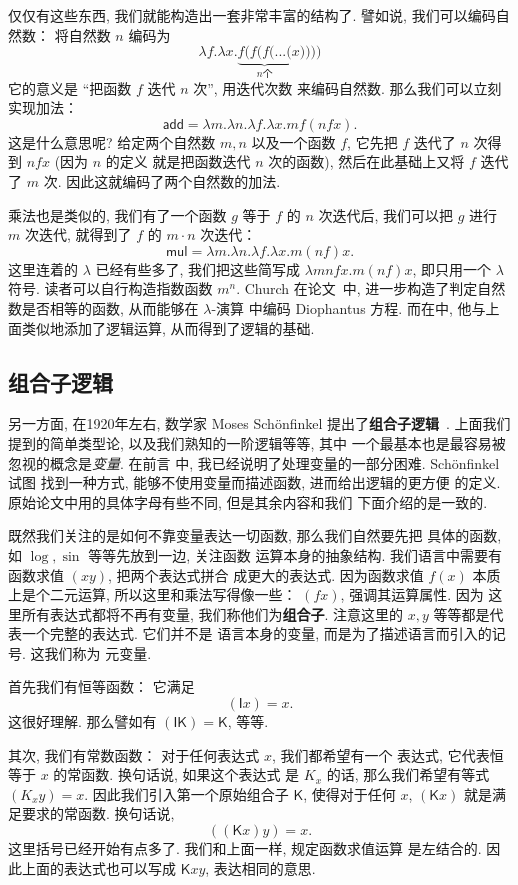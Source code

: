 \documentclass[UTF8]{ctexbook}
\newcommand{\cons}[1]{\textsf{#1}}
\theoremstyle{plain}
\theoremstyle{definition}
\theoremstyle{remark}
\begin{document}
仅仅有这些东西, 我们就能构造出一套非常丰富的结构了. 譬如说,
我们可以编码自然数： 将自然数 \(n\) 编码为
\[\lambda f. \lambda x. \underbrace{f(f(f(...(}_{n\text{个}}x))))\]
它的意义是 “把函数 \(f\) 迭代 \(n\) 次”, 用迭代次数
来编码自然数. 那么我们可以立刻实现加法：
\[\cons{add} = \lambda m. \lambda n. \lambda f. \lambda x. mf(nfx).\]
这是什么意思呢? 给定两个自然数 \(m, n\) 以及一个函数 \(f\),
它先把 \(f\) 迭代了 \(n\) 次得到 \(nfx\) (因为 \(n\) 的定义
就是把函数迭代 \(n\) 次的函数), 然后在此基础上又将
\(f\) 迭代了 \(m\) 次. 因此这就编码了两个自然数的加法.

乘法也是类似的, 我们有了一个函数 \(g\) 等于 \(f\) 的 \(n\)
次迭代后, 我们可以把 \(g\) 进行 \(m\) 次迭代, 就得到了
\(f\) 的 \(m\cdot n\) 次迭代：
\[\cons{mul} = \lambda m. \lambda n. \lambda f. \lambda x. m(nf)x.\]
这里连着的 \(\lambda\) 已经有些多了, 我们把这些简写成
\(\lambda mnfx. m(nf)x\), 即只用一个 \(\lambda\) 符号.
读者可以自行构造指数函数 \(m^n\). Church 在论文~\cite{church:1936:lambda}中,
进一步构造了判定自然数是否相等的函数, 从而能够在 \(\lambda\)-演算
中编码 Diophantus 方程. 而在\cite{church:1932:untyped}中,
他与上面类似地添加了逻辑运算, 从而得到了逻辑的基础.

\subsection{组合子逻辑}
另一方面, 在1920年左右, 数学家 Moses Sch\"onfinkel 提出了\textbf{组合子逻辑}~\cite{schonfinkel:1924:combinator}.
上面我们提到的简单类型论, 以及我们熟知的一阶逻辑等等, 其中
一个最基本也是最容易被忽视的概念是\emph{变量}. 在前言
中, 我已经说明了处理变量的一部分困难. Sch\"onfinkel 试图
找到一种方式, 能够不使用变量而描述函数, 进而给出逻辑的更方便
的定义. 原始论文中用的具体字母有些不同, 但是其余内容和我们
下面介绍的是一致的.

既然我们关注的是如何不靠变量表达一切函数, 那么我们自然要先把
具体的函数, 如 \(\log, \sin\) 等等先放到一边, 关注函数
运算本身的抽象结构. 我们语言中需要有函数求值 \((xy)\), 把两个表达式拼合
成更大的表达式. 因为函数求值 \(f(x)\) 本质上是个二元运算,
所以这里和乘法写得像一些： \((fx)\), 强调其运算属性. 因为
这里所有表达式都将不再有变量, 我们称他们为\textbf{组合子}.
注意这里的 \(x,y\) 等等都是代表一个完整的表达式. 它们并不是
语言本身的变量, 而是为了描述语言而引入的记号. 这我们称为
元变量.

首先我们有恒等函数： 它满足
\[(\cons{I}x) = x.\]
这很好理解. 那么譬如有 \((\cons{I}\cons{K}) = \cons{K}\),
等等.

其次, 我们有常数函数： 对于任何表达式 \(x\), 我们都希望有一个
表达式, 它代表恒等于 \(x\) 的常函数. 换句话说, 如果这个表达式
是 \(K_x\) 的话, 那么我们希望有等式
\((K_xy) = x\).
因此我们引入第一个原始组合子 \(\cons{K}\), 使得对于任何
\(x\), \((\cons{K}x)\) 就是满足要求的常函数. 换句话说,
\[((\cons{K}x)y) = x.\]
这里括号已经开始有点多了. 我们和上面一样, 规定函数求值运算
是左结合的. 因此上面的表达式也可以写成 \(\cons{K}xy\),
表达相同的意思.
\end{document}
